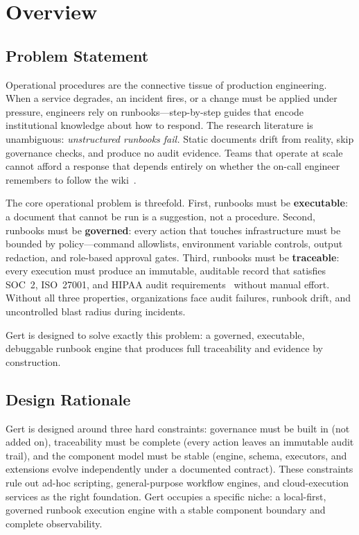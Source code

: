 \chapter{Overview}
\label{ch:overview}

\section{Problem Statement}

Operational procedures are the connective tissue of production engineering. When a service degrades,
an incident fires, or a change must be applied under pressure, engineers rely on runbooks---step-by-step
guides that encode institutional knowledge about how to respond. The research literature is unambiguous:
\textit{unstructured runbooks fail.} Static documents drift from reality, skip governance checks, and
produce no audit evidence. Teams that operate at scale cannot afford a response that depends entirely on
whether the on-call engineer remembers to follow the wiki~\cite{ibm-redbook-runbooks,ijsret-runbook-engineering}.

The core operational problem is threefold. First, runbooks must be \textbf{executable}: a document that
cannot be run is a suggestion, not a procedure. Second, runbooks must be \textbf{governed}: every action
that touches infrastructure must be bounded by policy---command allowlists, environment variable
controls, output redaction, and role-based approval gates. Third, runbooks must be \textbf{traceable}:
every execution must produce an immutable, auditable record that satisfies SOC~2, ISO~27001, and HIPAA
audit requirements~\cite{soc2-aicpa,iso27001,hipaa-security-rule} without manual effort. Without all three properties, organizations face audit
failures, runbook drift, and uncontrolled blast radius during incidents.

Gert is designed to solve exactly this problem: a governed, executable, debuggable runbook engine that
produces full traceability and evidence by construction.

\section{Design Rationale}

Gert is designed around three hard constraints: governance must be built in (not added on),
traceability must be complete (every action leaves an immutable audit trail), and the
component model must be stable (engine, schema, executors, and extensions evolve independently
under a documented contract). These constraints rule out ad-hoc scripting, general-purpose
workflow engines, and cloud-execution services as the right foundation. Gert occupies a
specific niche: a local-first, governed runbook execution engine with a stable component
boundary and complete observability.

